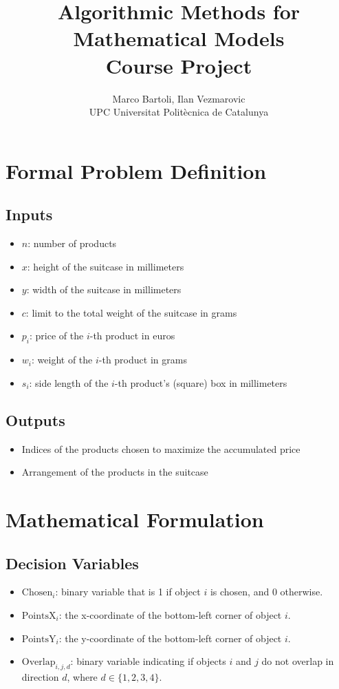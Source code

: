 \documentclass{article}
\title{Algorithmic Methods for Mathematical Models\\
 Course Project}
\author{Marco Bartoli, Ilan Vezmarovic \\
    UPC Universitat Politècnica de Catalunya}
\begin{document}
\maketitle

\section{Formal Problem Definition}

\subsection{Inputs}

\begin{itemize}
    \item $n$: number of products
    \item $x$: height of the suitcase in millimeters
    \item $y$: width of the suitcase in millimeters
    \item $c$: limit to the total weight of the suitcase in grams
    \item $p_i$: price of the $i$-th product in euros
    \item $w_i$: weight of the $i$-th product in grams
    \item $s_i$: side length of the $i$-th product's (square) box in millimeters
\end{itemize}

\subsection{Outputs}

\begin{itemize}
    \item Indices of the products chosen to maximize the accumulated price
    \item Arrangement of the products in the suitcase
\end{itemize}

\section{Mathematical Formulation}

\subsection{Decision Variables}

\begin{itemize}
    \item $\text{Chosen}_i$: binary variable that is 1 if object $i$ is chosen, and 0 otherwise.
    \item $\text{PointsX}_i$: the x-coordinate of the bottom-left corner of object $i$.
    \item $\text{PointsY}_i$: the y-coordinate of the bottom-left corner of object $i$.
    \item $\text{Overlap}_{i,j,d}$: binary variable indicating if objects $i$ and $j$ do not overlap in direction $d$, where $d \in \{1, 2, 3, 4\}$.
\end{itemize}
\end{document}

